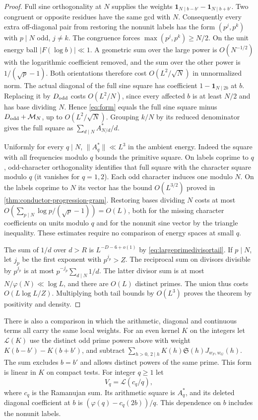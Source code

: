 \documentclass[11pt,a4paper]{article}
\numberwithin{equation}{section}
\newcommand{\SSS}{\mathfrak S}
\begin{document}
\begin{proof}
Full sine orthogonality at $N$ supplies the weights
$\mathbf1_{N\mid b-b'}-\mathbf1_{N\mid b+b'}$. Two congruent or
opposite residues have the same gcd with $N$. Consequently every
extra off-diagonal pair from restoring the nonunit labels has the
form $(p^j,p^k)$ with $p\mid N$ odd, $j\ne k$. The congruence
forces $\max(p^j,p^k)\ge N/2$. On the unit energy ball
$|F(\log b)|\ll1$. A geometric sum over the large power is
$O(N^{-1/2})$ with the logarithmic coefficient removed, and the
sum over the other power is $1/(\sqrt p-1)$. Both orientations
therefore cost $O(L^2/\sqrt N)$ in unnormalized norm.
The actual diagonal of the full sine square has coefficient
$1-\mathbf1_{N\mid2b}$ at $b$. Replacing it by $D_{\rm odd}$
costs $O(L^2/N)$, since every affected $b$ is at least $N/2$
and has base dividing $N$. Hence \eqref{eq:form} equals the
full sine square minus $D_{\rm odd}+\mathcal M_N$, up to
$O(L^2/\sqrt N)$. Grouping $k/N$ by its reduced denominator
gives the full square as $\sum_{d\mid N}A_{N/d}^*/d$.

Uniformly for every $q\mid N$, $\|A_q^*\|\ll L^3$ in the
ambient energy. Indeed the square with all frequencies modulo
$q$ bounds the primitive square. On labels coprime to $q$,
odd-character orthogonality identifies that full square with
the character square modulo $q$ (it vanishes for $q=1,2$).
Each odd character induces one modulo $N$. On the labels coprime
to $N$ its vector has the bound $O(L^{3/2})$ proved in
\cref{thm:conductor-progression-gram}. Restoring bases dividing
$N$ costs at most $O(\sum_{p\mid N}\log p/(\sqrt p-1))=O(L)$,
both for the missing character coefficients on units modulo $q$
and for the nonunit sine vector by the triangle inequality.
These estimates require no comparison of energy spaces at small $q$.

The sum of $1/d$ over $d>R$ is $L^{-D-6+o(1)}$ by
\eqref{eq:largeprimedivisortail}. If $p\mid N$, let $j_p$ be
the first exponent with $p^{j_p}>Z$. The reciprocal sum on
divisors divisible by $p^{j_p}$ is at most
$p^{-j_p}\sum_{d\mid N}1/d$. The latter divisor sum is at most
$N/\varphi(N)\ll\log L$, and there are $O(L)$ distinct primes.
The union thus costs $O(L\log L/Z)$. Multiplying both tail
bounds by $O(L^3)$ proves the theorem by positivity and density.
\end{proof}

There is also a comparison in which the arithmetic, diagonal and
continuous terms all carry the same local weights. For an even
kernel $K$ on the integers let $\mathcal L(K)$ use the distinct
odd prime powers above with weight $K(b-b')-K(b+b')$, and
subtract $\sum_{h>0,\,2\mid h}K(h)\SSS(h)J_{w_F,w_G}(h)$.
The sum excludes $b=b'$ and allows distinct powers of the same
prime. This form is linear in $K$ on compact tests. For integer
$q\ge1$ let
\[
 V_q=\mathcal L(c_q/q),
\]
where $c_q$ is the Ramanujan sum. Its arithmetic square is
$A_q^*$, and its deleted diagonal coefficient at $b$ is
$(\varphi(q)-c_q(2b))/q$. This dependence on $b$ includes
the nonunit labels.
\end{document}
